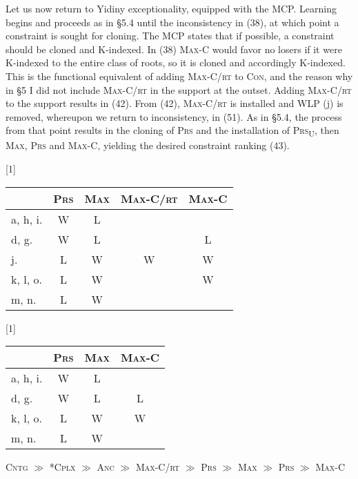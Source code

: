 \documentclass[output=paper,
modfonts
]{LSP/langsci}
\begin{document}
Let us now return to Yidiny exceptionality, equipped with the MCP. Learning begins and proceeds as in §5.4 until the inconsistency in (38), at which point a constraint is sought for cloning. The MCP states that if possible, a constraint should be cloned and K-indexed. In (38) \textsc{Max}{}-C would favor no losers if it were K-indexed to the entire class of roots, so it is cloned and accordingly K-indexed. This is the functional equivalent of adding \textsc{Max}{}-C/\textsc{rt} to \textsc{Con,} and\textsc{} the reason why in §5 I did not include \textsc{Max}{}-C/\textsc{rt} in the support at the outset. Adding \textsc{Max-C/rt} to the support results in (42). From (42), \textsc{Max-C/rt} is installed and WLP (j) is removed, whereupon we return to inconsistency, in (51). As in §5.4, the process from that point results in the cloning of \textsc{Prs} and the installation of \textsc{Prs}\textsc{\textsubscript{U}}, then \textsc{Max}, \textsc{Prs} and \textsc{Max-C,} yielding the desired constraint ranking (43).\textsc{} 


\ea 
\renewcommand*\arraystretch{1.2}
\scalebox{1}[1]{\begin{tabular}[t]{|l|c|c||c|c|}
\firsthline & \textsc{Prs} & \textsc{Max} & \textsc{Max-C/rt} & \textsc{Max-C} \\
\hline
\hline a, h, i. & W & L &  & \\
\hline d, g. & W & L &  & L \\
\hline j. & L & W & W & W\\
\hline k, l, o. & L & W & & W \\
\hline m, n. &  L & W & & \\
\hline \end{tabular}} \renewcommand*\arraystretch{1}
\z

\ea 
\renewcommand*\arraystretch{1.2}
\scalebox{1}[1]{\begin{tabular}[t]{|l|c||c|c|}
\firsthline & \textsc{Prs} & \textsc{Max} & \textsc{Max-C} \\
\hline
\hline a, h, i. & W & L  & \\
\hline d, g. & W & L & L \\
\hline k, l, o. & L & W & W \\
\hline m, n. &  L & W &  \\
\hline \end{tabular}} \renewcommand*\arraystretch{1}
\z

\ea
\textsc{Cntg} \textsc{${\gg}$}\textsc{} \textsc{*Cplx} \textsc{${\gg}$} \textsc{Anc} \textsc{${\gg}$} \textsc{Max-C/rt} \textsc{${\gg}$}\textsc{} \textsc{Prs}\textit{} ${\gg}$ \textsc{Max} \textsc{${\gg}$}\textsc{} \textsc{Prs} \textsc{${\gg}$} \textsc{Max-C}
\z
\end{document}

